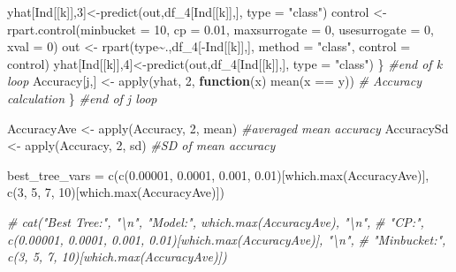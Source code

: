\documentclass[
]{article}
\newenvironment{Shaded}{\begin{snugshade}}{\end{snugshade}}
\newcommand{\AttributeTok}[1]{\textcolor[rgb]{0.77,0.63,0.00}{#1}}
\newcommand{\CommentTok}[1]{\textcolor[rgb]{0.56,0.35,0.01}{\textit{#1}}}
\newcommand{\ControlFlowTok}[1]{\textcolor[rgb]{0.13,0.29,0.53}{\textbf{#1}}}
\newcommand{\DecValTok}[1]{\textcolor[rgb]{0.00,0.00,0.81}{#1}}
\newcommand{\FloatTok}[1]{\textcolor[rgb]{0.00,0.00,0.81}{#1}}
\newcommand{\FunctionTok}[1]{\textcolor[rgb]{0.00,0.00,0.00}{#1}}
\newcommand{\NormalTok}[1]{#1}
\newcommand{\OtherTok}[1]{\textcolor[rgb]{0.56,0.35,0.01}{#1}}
\newcommand{\SpecialCharTok}[1]{\textcolor[rgb]{0.00,0.00,0.00}{#1}}
\newcommand{\StringTok}[1]{\textcolor[rgb]{0.31,0.60,0.02}{#1}}
\begin{document}
\begin{Shaded}
\begin{Highlighting}[]
\NormalTok{    yhat[Ind[[k]],}\DecValTok{3}\NormalTok{]}\OtherTok{\textless{}{-}}\FunctionTok{predict}\NormalTok{(out,df\_4[Ind[[k]],], }\AttributeTok{type =} \StringTok{"class"}\NormalTok{)}
\NormalTok{    control }\OtherTok{\textless{}{-}} \FunctionTok{rpart.control}\NormalTok{(}\AttributeTok{minbucket =} \DecValTok{10}\NormalTok{, }\AttributeTok{cp =} \FloatTok{0.01}\NormalTok{, }\AttributeTok{maxsurrogate =} \DecValTok{0}\NormalTok{, }\AttributeTok{usesurrogate =} \DecValTok{0}\NormalTok{, }\AttributeTok{xval =} \DecValTok{0}\NormalTok{)}
\NormalTok{    out }\OtherTok{\textless{}{-}} \FunctionTok{rpart}\NormalTok{(type}\SpecialCharTok{\textasciitilde{}}\NormalTok{.,df\_4[}\SpecialCharTok{{-}}\NormalTok{Ind[[k]],], }\AttributeTok{method =} \StringTok{"class"}\NormalTok{, }\AttributeTok{control =}\NormalTok{ control)}
\NormalTok{    yhat[Ind[[k]],}\DecValTok{4}\NormalTok{]}\OtherTok{\textless{}{-}}\FunctionTok{predict}\NormalTok{(out,df\_4[Ind[[k]],], }\AttributeTok{type =} \StringTok{"class"}\NormalTok{)}
\NormalTok{  \} }\CommentTok{\#end of k loop}
\NormalTok{  Accuracy[j,] }\OtherTok{\textless{}{-}} \FunctionTok{apply}\NormalTok{(yhat, }\DecValTok{2}\NormalTok{, }\ControlFlowTok{function}\NormalTok{(x) }\FunctionTok{mean}\NormalTok{(x }\SpecialCharTok{==}\NormalTok{ y)) }\CommentTok{\# Accuracy calculation}
\NormalTok{\} }\CommentTok{\#end of j loop}

\NormalTok{AccuracyAve }\OtherTok{\textless{}{-}} \FunctionTok{apply}\NormalTok{(Accuracy, }\DecValTok{2}\NormalTok{, mean) }\CommentTok{\#averaged mean accuracy}
\NormalTok{AccuracySd }\OtherTok{\textless{}{-}} \FunctionTok{apply}\NormalTok{(Accuracy, }\DecValTok{2}\NormalTok{, sd)  }\CommentTok{\#SD of mean accuracy}

\NormalTok{best\_tree\_vars }\OtherTok{=} \FunctionTok{c}\NormalTok{(}\FunctionTok{c}\NormalTok{(}\FloatTok{0.00001}\NormalTok{, }\FloatTok{0.0001}\NormalTok{, }\FloatTok{0.001}\NormalTok{, }\FloatTok{0.01}\NormalTok{)[}\FunctionTok{which.max}\NormalTok{(AccuracyAve)], }\FunctionTok{c}\NormalTok{(}\DecValTok{3}\NormalTok{, }\DecValTok{5}\NormalTok{, }\DecValTok{7}\NormalTok{, }\DecValTok{10}\NormalTok{)[}\FunctionTok{which.max}\NormalTok{(AccuracyAve)])}

\CommentTok{\# cat("Best Tree:", "\textbackslash{}n", "Model:", which.max(AccuracyAve), "\textbackslash{}n", }
\CommentTok{\#     "CP:", c(0.00001, 0.0001, 0.001, 0.01)[which.max(AccuracyAve)], "\textbackslash{}n", }
\CommentTok{\#     "Minbucket:", c(3, 5, 7, 10)[which.max(AccuracyAve)])}
\end{Highlighting}
\end{Shaded}
\end{document}
